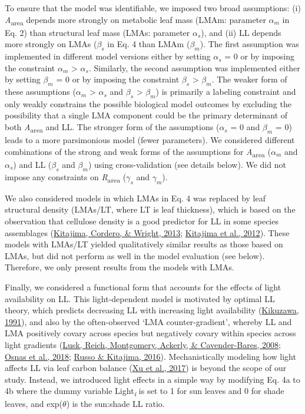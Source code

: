 \documentclass[
  12pt,
  letterpaper,
  DIV=11,
  numbers=noendperiod]{scrartcl}
\begin{document}
To ensure that the model was identifiable, we imposed two broad
assumptions: (i) \emph{A}\textsubscript{area} depends more strongly on
metabolic leaf mass (LMAm: parameter \(\alpha_m\) in Eq. 2) than
structural leaf mass (LMAs: parameter \(\alpha_s\)), and (ii) LL depends
more strongly on LMAs (\(\beta_s\) in Eq. 4 than LMAm (\(\beta_m\)). The
first assumption was implemented in different model versions either by
setting \(\alpha_s\) = 0 or by imposing the constraint \(\alpha_m\)
\textgreater{} \(\alpha_s\). Similarly, the second assumption was
implemented either by setting \(\beta_m\) = 0 or by imposing the
constraint \(\beta_s\) \textgreater{} \(\beta_m\). The weaker form of
these assumptions (\(\alpha_m\) \textgreater{} \(\alpha_s\) and
\(\beta_s\) \textgreater{} \(\beta_m\)) is primarily a labeling
constraint and only weakly constrains the possible biological model
outcomes by excluding the possibility that a single LMA component could
be the primary determinant of both \emph{A}\textsubscript{area} and LL.
The stronger form of the assumptions (\(\alpha_s\) = 0 and \(\beta_m\) =
0) leads to a more parsimonious model (fewer parameters). We considered
different combinations of the strong and weak forms of the assumptions
for \emph{A}\textsubscript{area} (\(\alpha_m\) and \(\alpha_s\)) and LL
(\(\beta_s\) and \(\beta_m\)) using cross-validation (see details
below). We did not impose any constraints on
\emph{R}\textsubscript{area} (\(\gamma_s\) and \(\gamma_m\)).

We also considered models in which LMAs in Eq. 4 was replaced by leaf
structural density (LMAs/LT, where LT is leaf thickness), which is based
on the observation that cellulose density is a good predictor for LL in
some species assemblages (\protect\hyperlink{ref-Kitajima2013}{Kitajima,
Cordero, \& Wright, 2013}; \protect\hyperlink{ref-Kitajima2012}{Kitajima
et al., 2012}). These models with LMAs/LT yielded qualitatively similar
results as those based on LMAs, but did not perform as well in the model
evaluation (see below). Therefore, we only present results from the
models with LMAs.

Finally, we considered a functional form that accounts for the effects
of light availability on LL. This light-dependent model is motivated by
optimal LL theory, which predicts decreasing LL with increasing light
availability (\protect\hyperlink{ref-Kikuzawa1991}{Kikuzawa, 1991}), and
also by the often-observed `LMA counter-gradient', whereby LL and LMA
positively covary across species but negatively covary within species
across light gradients (\protect\hyperlink{ref-Lusk2008}{Lusk, Reich,
Montgomery, Ackerly, \& Cavender-Bares, 2008};
\protect\hyperlink{ref-Osnas2018}{Osnas et al., 2018};
\protect\hyperlink{ref-Russo2016}{Russo \& Kitajima, 2016}).
Mechanistically modeling how light affects LL via leaf carbon balance
(\protect\hyperlink{ref-Xu2017}{Xu et al., 2017}) is beyond the scope of
our study. Instead, we introduced light effects in a simple way by
modifying Eq. 4a to 4b where the dummy variable
Light\textsubscript{\emph{i}} is set to 1 for sun leaves and 0 for shade
leaves, and exp(\(\theta\)) is the sun:shade LL ratio.
\end{document}
